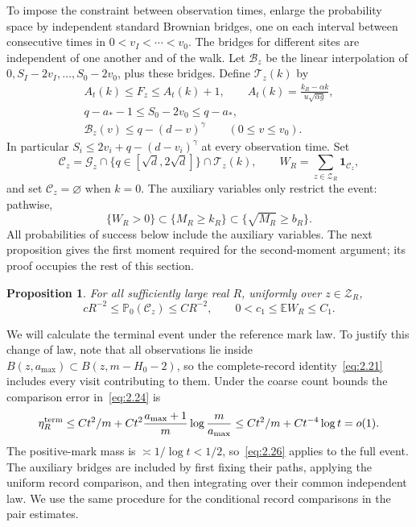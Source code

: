 \documentclass[11pt,letterpaper,reqno]{amsart}
\numberwithin{equation}{section}
\newtheorem{proposition}[theorem]{Proposition}
\theoremstyle{remark}
\begin{document}
\label{sec:success}
To impose the constraint between observation times, enlarge the probability space by independent standard Brownian bridges, one on each interval between consecutive times in $0<v_I<\cdots<v_0$. The bridges for different sites are independent of one another and of the walk. Let $\mathcal B_z$ be the linear interpolation of
$0,S_I-2v_I,\ldots,S_0-2v_0$, plus these bridges. Define $\mathcal T_z(k)$ by
\begin{equation}\label{eq:5.10}
\begin{gathered}
A_t(k)\le F_z\le A_t(k)+1,\qquad
A_t(k)=\frac{k_R-\alpha k}{u\sqrt{\alpha g}},\\
q-a_*-1\le S_0-2v_0\le q-a_*,\\
\mathcal B_z(v)\le q-(d-v)^\gamma\qquad(0\le v\le v_0).
\end{gathered}
\end{equation}
In particular $S_i\le2v_i+q-(d-v_i)^\gamma$ at every observation time.
Set
\begin{equation}\label{eq:5.15}
\mathcal C_z=\mathcal G_z\cap\{q\in[\sqrt d,2\sqrt d]\}\cap\mathcal T_z(k),
\qquad W_R=\sum_{z\in\mathscr Z_R}\mathbf1_{\mathcal C_z},
\end{equation}
and set $\mathcal C_z=\varnothing$ when $k=0$. The auxiliary variables only restrict the event: pathwise,
\begin{equation}\label{eq:5.16}
\{W_R>0\}\subset\{M_R\ge k_R\}\subset\{\sqrt{M_R}\ge b_R\}.
\end{equation}
All probabilities of success below include the auxiliary variables. The next proposition gives the first moment required for the second-moment argument; its proof occupies the rest of this section.

\begin{proposition}\label{prop:onepoint}
For all sufficiently large real $R$, uniformly over $z\in\mathscr Z_R$,
\begin{equation}\label{eq:7.28}
cR^{-2}\le\mathbb P_0(\mathcal C_z)\le CR^{-2},\qquad
0<c_1\le\mathbb EW_R\le C_1.
\end{equation}
\end{proposition}

\label{sec:lowercomparison}
We will calculate the terminal event under the reference mark law. To justify this change of law, note that all observations lie inside $B(z,a_{\max})\subset B(z,m-H_0-2)$, so the complete-record identity~\eqref{eq:2.21} includes every visit contributing to them.
Under the coarse count bounds the comparison error in~\eqref{eq:2.24} is
\begin{equation}\label{eq:5.17}
\eta_R^{\rm term}\le Ct^2/m+
Ct^2\frac{a_{\max}+1}{m}\log\frac m{a_{\max}}
\le Ct^2/m+Ct^{-4}\log t=o(1).
\end{equation}
The positive-mark mass is $\asymp1/\log t<1/2$, so~\eqref{eq:2.26}
applies to the full event. The auxiliary bridges are included by first fixing their paths, applying the uniform record comparison, and then integrating over their common independent law. We use the same procedure for the conditional record comparisons in the pair estimates.
\end{document}

